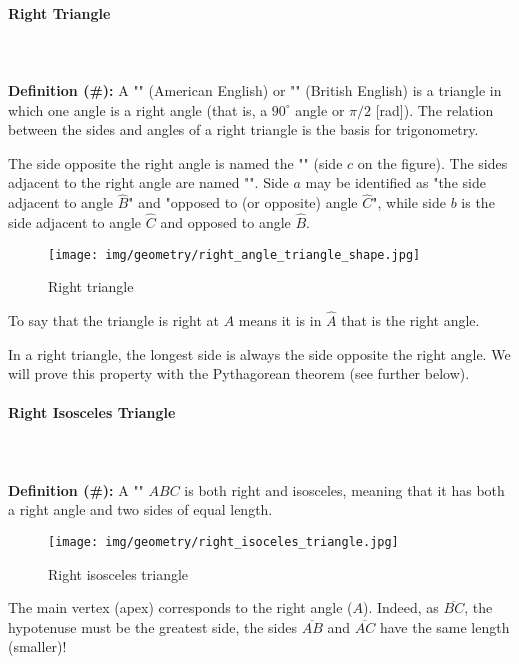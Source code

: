 	\paragraph{Right Triangle}\mbox{}\\\\
	\textbf{Definition (\#\mydef):} A "" (American English) or "" (British English) is a triangle in which one angle is a right angle (that is, a $90^\circ$ angle or $\pi/2$ [rad]). The relation between the sides and angles of a right triangle is the basis for trigonometry.

	The side opposite the right angle is named the "" (side $c$ on the figure). The sides adjacent to the right angle are named "". Side $a$ may be identified as "the side adjacent to angle $\hat{B}$" and "opposed to (or opposite) angle $\hat{C}$", while side $b$ is the side adjacent to angle $\hat{C}$ and opposed to angle $\hat{B}$.
	\begin{figure}[H]
		\centering
		\texttt{[image: img/geometry/right\_angle\_triangle\_shape.jpg]}
		\caption{Right triangle}
	\end{figure}
	To say that the triangle is right at $A$ means it is in $\hat{A}$ that is the right angle.
	\begin{tcolorbox}[title=Remark,colframe=black,arc=10pt]
	In a right triangle, the longest side is always the side opposite the right angle. We will prove this property with the Pythagorean theorem (see further below).
	\end{tcolorbox}
	
	\paragraph{Right Isosceles Triangle}\mbox{}\\\\
	\textbf{Definition (\#\mydef):} A "" $ABC$ is both right and isosceles, meaning that it has both a right angle and two sides of equal length.
	\begin{figure}[H]
		\centering
		\texttt{[image: img/geometry/right\_isoceles\_triangle.jpg]}
		\caption{Right isosceles triangle}
	\end{figure}
	The main vertex (apex) corresponds to the right angle ($A$). Indeed, as $\overline{BC}$, the hypotenuse must be the greatest side, the sides $\overline{AB}$ and $\overline{AC}$ have the same length (smaller)!
	
